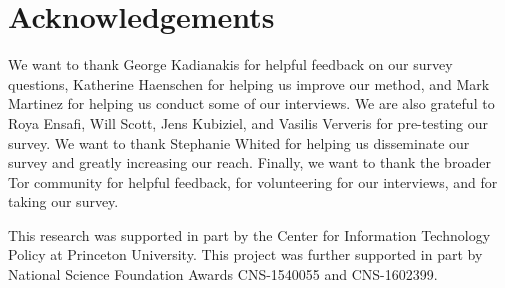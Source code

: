 \section*{Acknowledgements}
We want to thank George Kadianakis for helpful feedback on our survey questions,
Katherine Haenschen for helping us improve our method, and Mark Martinez for
helping us conduct some of our interviews.  We are also grateful to Roya Ensafi,
Will Scott, Jens Kubiziel, and Vasilis Ververis for pre-testing our survey.  We
want to thank Stephanie Whited for helping us disseminate our survey and greatly
increasing our reach.  Finally, we want to thank the broader Tor community for
helpful feedback, for volunteering for our interviews, and for taking our
survey.

This research was supported in part by the Center for Information Technology
Policy at Princeton University.  This project was further supported in part by
National Science Foundation Awards CNS-1540055 and CNS-1602399.
